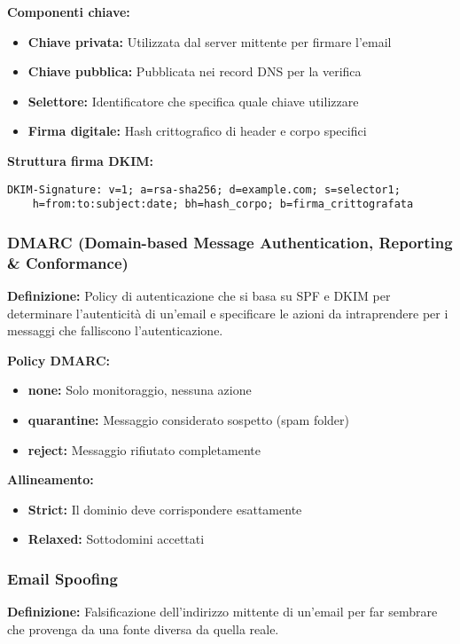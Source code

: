 \documentclass{article}
\begin{document}
\textbf{Componenti chiave:}
\begin{itemize}
    \item \textbf{Chiave privata:} Utilizzata dal server mittente per firmare l'email
    \item \textbf{Chiave pubblica:} Pubblicata nei record DNS per la verifica
    \item \textbf{Selettore:} Identificatore che specifica quale chiave utilizzare
    \item \textbf{Firma digitale:} Hash crittografico di header e corpo specifici
\end{itemize}

\textbf{Struttura firma DKIM:}
\begin{lstlisting}[caption=Struttura firma DKIM]
DKIM-Signature: v=1; a=rsa-sha256; d=example.com; s=selector1;
    h=from:to:subject:date; bh=hash_corpo; b=firma_crittografata
\end{lstlisting}

\subsubsection{DMARC (Domain-based Message Authentication, Reporting \& Conformance)}
\textbf{Definizione:} Policy di autenticazione che si basa su SPF e DKIM per determinare l'autenticità di un'email e specificare le azioni da intraprendere per i messaggi che falliscono l'autenticazione.

\textbf{Policy DMARC:}
\begin{itemize}
    \item \textbf{none:} Solo monitoraggio, nessuna azione
    \item \textbf{quarantine:} Messaggio considerato sospetto (spam folder)
    \item \textbf{reject:} Messaggio rifiutato completamente
\end{itemize}

\textbf{Allineamento:}
\begin{itemize}
    \item \textbf{Strict:} Il dominio deve corrispondere esattamente
    \item \textbf{Relaxed:} Sottodomini accettati
\end{itemize}

\subsubsection{Email Spoofing}
\textbf{Definizione:} Falsificazione dell'indirizzo mittente di un'email per far sembrare che provenga da una fonte diversa da quella reale.
\end{document}
